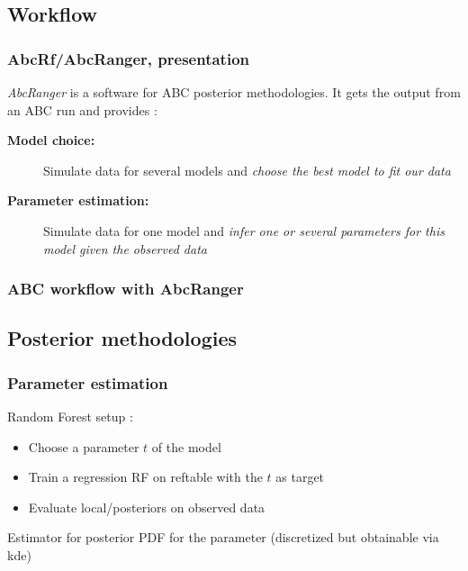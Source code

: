 \documentclass{beamer}
\begin{document}
    \subsection{Workflow}
    \begin{frame}
        \frametitle{AbcRf/AbcRanger, presentation}
        \emph{AbcRanger} is a software for ABC posterior methodologies. It gets the output from an ABC run and provides :
        \begin{description}
            \item[\color{darkred}\sffamily \textbf{Model choice:}] Simulate data for several models and \emph{choose the best model to fit our data}
            \item[\color{darkred}\sffamily \textbf{Parameter estimation:}] Simulate data for one model and \emph{infer one or several parameters for this model given the observed data}
          \end{description}
    \end{frame}

    \begin{frame}
        \frametitle{ABC workflow with AbcRanger}

        \begin{figure}
            \centering
            \fontsize{6pt}{7.2}\selectfont

              
          \end{figure}
    \end{frame} 

    \subsection{Posterior methodologies}
    \begin{frame}
        \frametitle{Parameter estimation}
        Random Forest setup :
        \begin{itemize}
            \item Choose a parameter $t$ of the model 
            \item Train a regression RF on reftable with the $t$ as target
            \item Evaluate local/posteriors on observed data
        \end{itemize}
         Estimator for posterior PDF for the parameter (discretized but obtainable via kde) 
    \end{frame}
\end{document}

